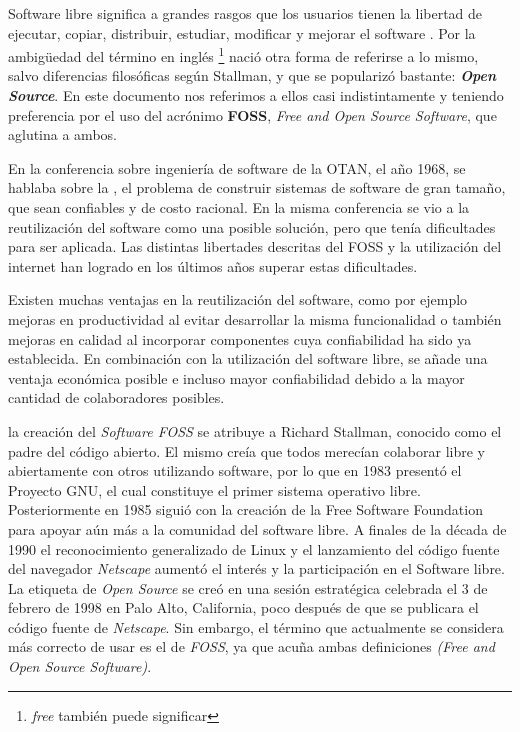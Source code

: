 Software libre significa a grandes rasgos que los usuarios tienen la libertad de ejecutar, copiar, distribuir, estudiar, modificar y mejorar el software \cite{QueEsSoftware}.
Por la ambigüedad del término en inglés
\footnote{\textit{free} también puede significar } 
nació otra forma de referirse a lo mismo, salvo diferencias filosóficas según Stallman\cite{WhyOpenSource}, y que se popularizó bastante: \textbf{\textit{Open Source}}. 
En este documento nos referimos a ellos casi indistintamente y teniendo preferencia por el uso del acrónimo \textbf{FOSS}, \textit{Free and Open Source Software}, que aglutina a ambos.

En la conferencia sobre ingeniería de software de la OTAN, el año 1968, se hablaba sobre la , 
el problema de construir sistemas de software de gran tamaño, que sean confiables y de costo racional.
En la misma conferencia se vio a la reutilización del software como una posible solución, pero que tenía dificultades para ser aplicada\cite{kruegerSoftwareReuse1992}.
Las distintas libertades descritas del FOSS y la utilización del internet han logrado en los últimos años superar estas dificultades.

Existen muchas ventajas en la reutilización del software, 
como por ejemplo mejoras en productividad al evitar desarrollar la misma funcionalidad o también 
mejoras en calidad al incorporar componentes cuya confiabilidad ha sido ya establecida\cite{selbyEnablingReusebasedSoftware2005}. 
En combinación con la utilización del software libre, se añade una ventaja económica posible e incluso mayor confiabilidad debido a la mayor cantidad de colaboradores posibles.




la creación del \textit{Software FOSS} se atribuye a Richard Stallman, conocido
como el padre del código abierto. El mismo creía que todos merecían colaborar
libre y abiertamente con otros utilizando software, por lo que en 1983 presentó
el Proyecto GNU, el cual constituye el primer sistema operativo libre.
Posteriormente en 1985 siguió con la creación de la Free Software Foundation
para apoyar aún más a la comunidad del software libre. A finales de la década de
1990 el reconocimiento generalizado de Linux y el lanzamiento del código fuente
del navegador \textit{Netscape} aumentó el interés y la participación en el
Software libre. La etiqueta de \textit{Open Source} se creó en una sesión
estratégica celebrada el 3 de febrero de 1998 en Palo Alto, California, poco
después de que se publicara el código fuente de \textit{Netscape}. Sin embargo,
el término que actualmente se considera más correcto de usar es el de
\textit{FOSS}, ya que acuña ambas definiciones \textit{(Free and Open Source
    Software)}.

